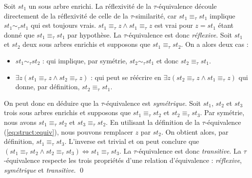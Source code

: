 \begin{proposition}
    Soit $st_1$ un sous arbre enrichi.
    La réflexivité de la $\tau$-équivalence découle directement de la réflexivité de celle de la $\tau$-similarité, car $st_1 \equiv_\tau st_1$ implique $st_1 \sim_\tau st_1$ qui est toujours vrais.
    $st_1 \equiv_\tau z \land st_1 \equiv_\tau z$ est vrai pour $z = st_1$ étant donné que $st_1 \equiv_\tau st_1$ par hypothèse.
    La $\tau$-équivalence est donc \emph{réflexive}.
    Soit $st_1$ et $st_2$ deux sous arbres enrichis et supposons que $st_1 \equiv_\tau st_2$.
    On a alors deux cas :
    \begin{itemize}
        \item  $st_1 \sim_\tau st_2$ : qui implique, par symétrie, $st_2 \sim_\tau st_1$ et donc  $st_2 \equiv_\tau st_1$.
        \item $\exists z (st_1 \equiv_\tau z \land st_2 \equiv_\tau z)$ : qui peut se réécrire en $\exists z (st_2 \equiv_\tau z \land st_1 \equiv_\tau z)$ qui donne, par définition, $st_2 \equiv_\tau st_1$.
    \end{itemize}
    On peut donc en déduire que la $\tau$-équivalence est \emph{symétrique}.
    Soit $st_1$, $st_2$ et $st_3$ trois sous arbres enrichis et supposons que $st_1 \equiv_\tau st_2$ et $st_2 \equiv_\tau st_3$.
    Par symétrie, nous avons $st_1 \equiv_\tau st_2$ et $st_3 \equiv_\tau st_2$.
    En utilisant la définition de la $\tau$-équivalence (\ref{eq:struct:equiv}), nous pouvons remplacer $z$ par $st_2$.
    On obtient alors, par définition, $st_1 \equiv_\tau st_3$.
    L'inverse est trivial et on peut conclure que $(st_1 \equiv_\tau st_2 \land st_2 \equiv_\tau st_3) \iff st_1 \equiv_\tau st_3$.
    La $\tau$-équivalence est donc \emph{transitive}.
    La $\tau$-équivalence respecte les trois propriétés d'une relation d'équivalence : \emph{réflexive}, \emph{symétrique} et \emph{transitive}.
    \qed
\end{proposition}

